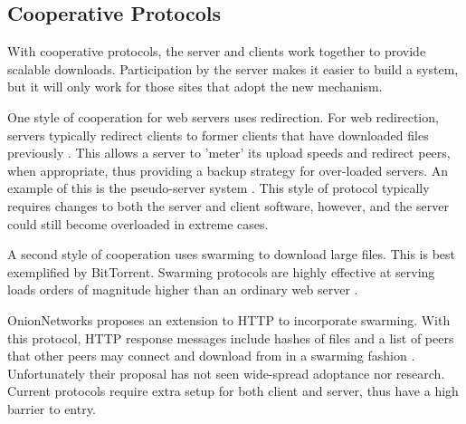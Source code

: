 
\subsection{Cooperative Protocols}

With cooperative protocols, the server and clients work together to provide scalable downloads.  Participation by the server makes it easier to build a system,
but it will only work for those sites that adopt the new mechanism.  

One style of cooperation for web servers uses redirection.  For web redirection, servers typically redirect clients to former clients that have downloaded files previously \cite{pseudoserving, coopnet}.  This allows a server to 'meter' its upload speeds and redirect peers, when appropriate, thus providing a backup strategy for over-loaded servers.  An example of this is the pseudo-server system \cite{pseudoserving}.  This style of protocol typically requires changes to both the server and client software, however, and the server could still become overloaded in extreme cases.

A second style of cooperation uses swarming to download large files.  This is best exemplified by BitTorrent.  Swarming protocols are highly effective at serving loads orders of magnitude higher than an ordinary web server \cite{zappala}.

OnionNetworks proposes an extension to HTTP to incorporate swarming.  With this protocol, HTTP response messages include hashes of files and a list of peers that other peers 
may connect and download from in a swarming fashion \cite{onion}.  Unfortunately their proposal has not seen wide-spread adoptance nor research.  Current protocols require extra setup for both client and server, thus have a high barrier to entry.

